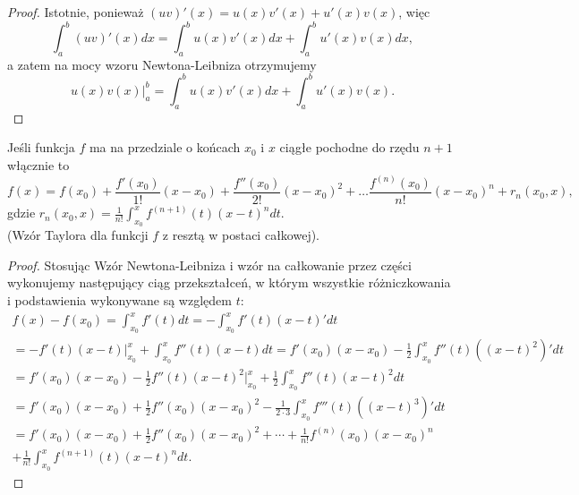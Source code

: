 \documentclass[leqno]{article}
\begin{document}
\begin{justify}
\begin{proof}
    Istotnie, ponieważ $(uv)'(x) = u(x)v'(x) + u'(x)v(x)$, więc
    \[
        \int_{a}^{b}(uv)'(x)dx = \int_{a}^{b}u(x)v'(x)dx + \int_{a}^{b}u'(x)v(x)dx,
    \]
    a zatem na mocy wzoru Newtona-Leibniza otrzymujemy 
    \[
        u(x)v(x) \big|_a^b = \int_{a}^{b}u(x)v'(x)dx + \int_{a}^{b}u'(x)v(x).
    \]
\end{proof}

\begin{wniosek}
{
    Jeśli funkcja $f$ ma na przedziale o końcach $x_0$ i $x$ ciągłe pochodne do rzędu $n+1$ włącznie to
    \begin{equation*}
        f(x) = f(x_0) + \frac{f'(x_0)}{1!}(x-x_0) + \frac{f''(x_0)}{2!}{(x-x_0)}^2 + \ldots \frac{f^{(n)}(x_0)}{n!}{(x-x_0)}^n + r_n(x_0, x),
    \end{equation*}
    gdzie $r_n(x_0, x) = \frac{1}{n!}\int_{x_0}^{x}f^{(n+1)}(t){(x-t)}^n dt$. \\
    (Wzór Taylora dla funkcji $f$ z resztą w postaci całkowej).
}
\end{wniosek}

\begin{proof}
    Stosując Wzór Newtona-Leibniza i wzór na całkowanie przez części wykonujemy następujący ciąg przekształceń, w którym wszystkie różniczkowania i podstawienia
    wykonywane są względem $t$: 
    \begin{multline*}
        f(x) - f(x_0) = \int_{x_0}^{x}f'(t)dt = -\int_{x_0}^{x}f'(t)(x-t)'dt \\
        = -f'(t)(x-t) \big|_{x_0}^x + \int_{x_0}^{x}f''(t)(x-t)dt = f'(x_0)(x-x_0) - \frac{1}{2}\int_{x_0}^{x}f''(t)({(x-t)}^2)'dt \\
        = f'(x_0)(x-x_0) - \frac{1}{2}f''(t){(x-t)}^2 \big|_{x_0}^x + \frac{1}{2}\int_{x_0}^{x}f''(t){(x-t)}^2dt \\
        = f'(x_0)(x-x_0) + \frac{1}{2}f''(x_0){(x-x_0)}^2 - \frac{1}{2 \cdot 3}\int_{x_0}^{x}f'''(t)({(x-t)}^3)'dt \\
        = f'(x_0)(x-x_0) + \frac{1}{2}f''(x_0){(x-x_0)}^2 + \cdots + \frac{1}{n!}f^{(n)}(x_0){(x-x_0)}^n \\ 
        + \frac{1}{n!}\int_{x_0}^{x}f^{(n+1)}(t){(x-t)}^n dt.
    \end{multline*}
\end{proof}


\end{justify}
\end{document}
